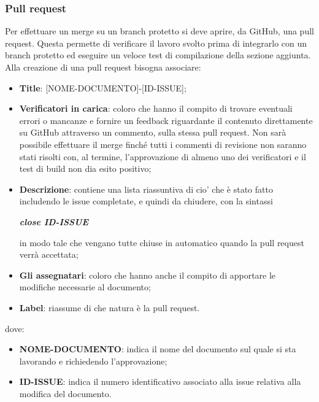         \subsubsection{Pull request}\label{inf:pr}
        Per effettuare un merge su un branch protetto si deve aprire, da GitHub, una pull request. Questa
        permette di verificare il lavoro svolto prima di integrarlo con un branch protetto ed eseguire un veloce test di compilazione della sezione aggiunta.
        Alla creazione di una pull request bisogna associare:
        \begin{itemize}
            \item \textbf{Title}: [NOME-DOCUMENTO]-[ID-ISSUE];
            \item \textbf{Verificatori in carica}: coloro che hanno il compito di trovare eventuali errori o mancanze e fornire un feedback
            riguardante il contenuto direttamente su GitHub attraverso un commento, sulla stessa pull request.
            Non sarà possibile effettuare il merge finché tutti i commenti di revisione non saranno stati risolti
            con, al termine, l'approvazione di almeno uno dei verificatori e il test di build non dia esito positivo;
            \item \textbf{Descrizione}: contiene una lista riassuntiva di cio' che è stato fatto includendo le issue completate, e quindi da chiudere,
            con la sintassi
            \begin{center}
                \textbf{\textit{close ID-ISSUE}}
            \end{center}
            in modo tale che vengano tutte chiuse in automatico quando la pull request verrà accettata;
            \item \textbf{Gli assegnatari}: coloro che hanno anche il compito di apportare le modifiche necessarie al documento;
            \item \textbf{Label}: riassume di che natura è la pull request.
        \end{itemize}
        dove:

        \begin{itemize}
            \item \textbf{NOME-DOCUMENTO}: indica il nome del documento sul quale si sta lavorando e richiedendo l'approvazione;
            \item \textbf{ID-ISSUE}: indica il numero identificativo associato alla issue relativa alla modifica del documento.
        \end{itemize}

